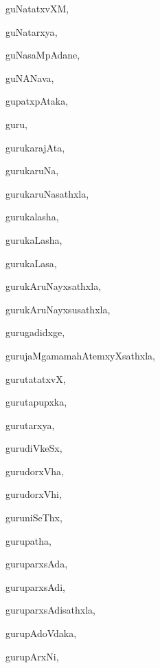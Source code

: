 \begin{multicols}{3}
{\noindent
{guNatatxvXM}, \pageref{guNatatxvXM}

\noindent
{guNatarxya}, \pageref{guNatarxya}

\noindent
{guNasaMpAdane}, \pageref{guNasaMpAdane}

\noindent
{guNANava}, \pageref{guNANava}

\noindent
{gupatxpAtaka}, \pageref{gupatxpAtaka}

\noindent
{guru}, \pageref{guru}

\noindent
{gurukarajAta}, \pageref{gurukarajAta}

\noindent
{gurukaruNa}, \pageref{gurukaruNa}

\noindent
{gurukaruNasathxla}, \pageref{gurukaruNasathxla}

\noindent
{gurukalasha}, \pageref{gurukalasha}

\noindent
{gurukaLasha}, \pageref{gurukaLasha}

\noindent
{gurukaLasa}, \pageref{gurukaLasa}

\noindent
{gurukAruNayxsathxla}, \pageref{gurukAruNayxsathxla}

\noindent
{gurukAruNayxsusathxla}, \pageref{gurukAruNayxsusathxla}

\noindent
{gurugadidxge}, \pageref{gurugadidxge}

\noindent
{gurujaMgamamahAtemxyXsathxla}, \pageref{gurujaMgamamahAtemxyXsathxla}

\noindent
{gurutatatxvX}, \pageref{gurutatatxvX}

\noindent
{gurutapupxka}, \pageref{gurutapupxka}

\noindent
{gurutarxya}, \pageref{gurutarxya}

\noindent
{gurudiVkeSx}, \pageref{gurudiVkeSx}

\noindent
{gurudorxVha}, \pageref{gurudorxVha}

\noindent
{gurudorxVhi}, \pageref{gurudorxVhi}

\noindent
{guruniSeThx}, \pageref{guruniSeThx}

\noindent
{gurupatha}, \pageref{gurupatha}

\noindent
{guruparxsAda}, \pageref{guruparxsAda}

\noindent
{guruparxsAdi}, \pageref{guruparxsAdi}

\noindent
{guruparxsAdisathxla}, \pageref{guruparxsAdisathxla}

\noindent
{gurupAdoVdaka}, \pageref{gurupAdoVdaka}

\noindent
{gurupArxNi}, \pageref{gurupArxNi}

}
\end{multicols}
